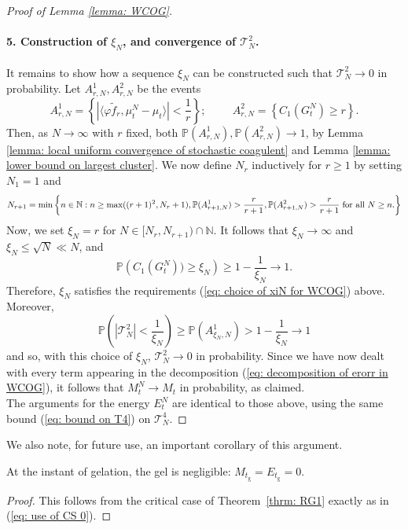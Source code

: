 \begin{proof}[Proof of Lemma \ref{lemma: WCOG}]
\paragraph{5. Construction of $\xi_N$, and convergence of $\mathcal{T}^2_N$.} It remains to show how a sequence $\xi_N$ can be constructed such that $\mathcal{T}^2_N \rightarrow 0$ in probability. Let $A^1_{r,N}, A^2_{r,N}$ be the events \begin{equation} \label{eq: definition of A1rn for WCOG}
       A^1_{r,N}=\left\{ |\langle \varphi \widetilde{f}_r, \mu^N_t-\mu_t\rangle|<\frac{1}{r}\right\}; \hspace{1cm}
       A^2_{r,N}=\left\{C_1(G^N_{t}) \geq r\right\}.
   \end{equation}
 Then, as $N\rightarrow \infty$ with $r$ fixed, both $\mathbb{P}(A^1_{r,N}), \mathbb{P}(A^2_{r,N}) \rightarrow 1$, by Lemma \ref{lemma: local uniform convergence of stochastic coagulent} and Lemma \ref{lemma: lower bound on largest cluster}. We now define $N_r$ inductively for $r\geq 1$ by setting $N_1=1$ and
 \begin{equation}
       \label{eq: recursive definition of Nr for WCOG} N_{r+1}=\min\left\{n \in \mathbb{N}: n\geq \max((r+1)^2, N_r+1),  \mathbb{P}(A^1_{r+1,N})>\frac{r}{r+1},  \mathbb{P}(A^2_{r+1,N})>\frac{r}{r+1} \hspace{0.1cm} \text{for all }N\geq n. \right\}
 \end{equation} 
 Now, we set $\xi_N=r$ for $N\in [N_r, N_{r+1})\cap\mathbb{N}.$ It follows that $\xi_N \rightarrow \infty$ and $\xi_N\leq \sqrt{N}\ll N$, and
 \begin{equation}
       \mathbb{P}\left(C_1(G^N_t))\geq \xi_N\right)\ge 1-\frac{1}{\xi_N} \rightarrow 1. 
 \end{equation} Therefore, $\xi_N$ satisfies the requirements (\ref{eq: choice of xiN for WCOG}) above. Moreover, \begin{equation}
       \mathbb{P}\left(|\mathcal{T}^2_N| <\frac{1}{\xi_N}\right) \ge \mathbb{P}\left(A^1_{\xi_N,N}\right) > 1-\frac{1}{\xi_N}\rightarrow 1
 \end{equation}
 and so, with this choice of $\xi_N$, $\mathcal{T}^2_N \rightarrow 0$ in probability. Since we have now dealt with every term appearing in the decomposition (\ref{eq: decomposition of erorr in WCOG}), it follows that $M^N_t\rightarrow M_t$ in probability, as claimed. \medskip \\ The arguments for the energy $E^N_t$ are identical to those above, using the same bound (\ref{eq: bound on T4}) on $\mathcal{T}^4_N$. \end{proof} We also note, for future use, an important corollary of this argument.
\begin{corollary}\label{corr: gel at tgel} At the instant of gelation, the gel is negligible: $ M_{t_\mathrm{g}}=E_{t_\mathrm{g}}=0.$  \end{corollary} \begin{proof} This follows from the critical case of Theorem~\ref{thrm: RG1} exactly as in (\ref{eq: use of CS 0}). \end{proof}